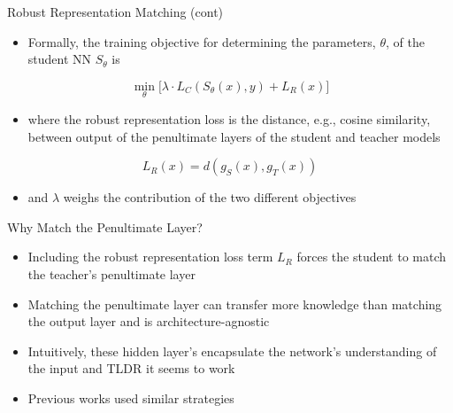 \documentclass{beamer}
\begin{document}
\begin{frame}{Robust Representation Matching (cont)}
	
	\begin{itemize}
		\item Formally, the training objective for determining the parameters, $\theta$, of the student NN $S_\theta$ is
	\end{itemize}

	$$\min_\theta \biggr [ \lambda \cdot L_C(S_\theta(x), y) + L_R(x) \biggr ]$$
	
	\begin{itemize}
		\item where the robust representation loss is the distance, e.g., cosine similarity, between output of the penultimate layers of the student and teacher models
	\end{itemize}

	$$L_R(x) = d(g_S(x), g_T(x))$$
	
		\begin{itemize}
			\item and $\lambda$ weighs the contribution of the two different objectives
		\end{itemize}
	
\end{frame}


\begin{frame}{Why Match the Penultimate Layer?}
	
	\begin{itemize}
		\item Including the robust representation loss term $L_R$ forces the student to match the teacher's penultimate layer
		\item Matching the penultimate layer can transfer more knowledge than matching the output layer and is architecture-agnostic
		\item Intuitively, these hidden layer's encapsulate the network's understanding of the input and TLDR it seems to work
		\item Previous works used similar strategies \cite{ilyas2019adversarial, goldblum2020adversarially}
	\end{itemize}
	
\end{frame}
\end{document}
